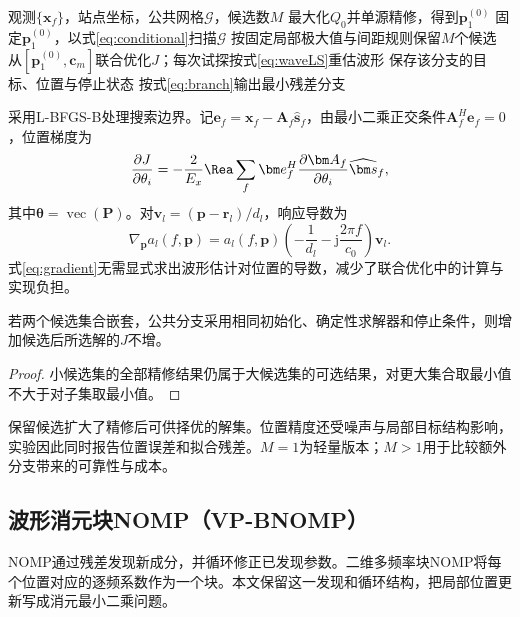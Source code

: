 \begin{algorithm}[H]
\caption{多候选联合精修AP}\label{alg:ap}
\begin{algorithmic}[1]
\Require 观测$\{\bm x_f\}$，站点坐标，公共网格$\mathcal G$，候选数$M$
\State 最大化$Q_0$并单源精修，得到$\bm p_1^{(0)}$
\State 固定$\bm p_1^{(0)}$，以式\eqref{eq:conditional}扫描$\mathcal G$
\State 按固定局部极大值与间距规则保留$M$个候选
  \State 从$[\bm p_1^{(0)},\bm c_m]$联合优化$J$；每次试探按式\eqref{eq:waveLS}重估波形
  \State 保存该分支的目标、位置与停止状态
\EndFor
\State 按式\eqref{eq:branch}输出最小残差分支
\end{algorithmic}
\end{algorithm}

采用L-BFGS-B处理搜索边界\cite{Byrd1995}。记$\bm e_f=\bm x_f-\bm A_f\widehat{\bm s}_f$，由最小二乘正交条件$\bm A_f^H\bm e_f=0$，位置梯度为
\begin{equation}
 \frac{\partial J}{\partial\theta_i}
 =-\frac{2}{E_x}\Rea\sum_f
 \bm e_f^H\frac{\partial\bm A_f}{\partial\theta_i}
 \widehat{\bm s}_f,\label{eq:gradient}
\end{equation}
其中$\bm\theta=\operatorname{vec}(\bm P)$。对$\bm v_l=(\bm p-\bm r_l)/d_l$，响应导数为
\begin{equation}
 \nabla_{\bm p}a_l(f,\bm p)
 =a_l(f,\bm p)\left(-\frac1{d_l}-\mathrm j\frac{2\pi f}{c_0}\right)\bm v_l.
 \label{eq:responseDerivative}
\end{equation}
式\eqref{eq:gradient}无需显式求出波形估计对位置的导数，减少了联合优化中的计算与实现负担。

\begin{proposition}[嵌套候选的目标关系]\label{prop:branches}
若两个候选集合嵌套，公共分支采用相同初始化、确定性求解器和停止条件，则增加候选后所选解的$J$不增。
\end{proposition}
\begin{proof}
小候选集的全部精修结果仍属于大候选集的可选结果，对更大集合取最小值不大于对子集取最小值。
\end{proof}
保留候选扩大了精修后可供择优的解集。位置精度还受噪声与局部目标结构影响，实验因此同时报告位置误差和拟合残差。$M=1$为轻量版本；$M>1$用于比较额外分支带来的可靠性与成本。

\subsection{波形消元块NOMP（VP-BNOMP）}\label{sec:vpnomp}
NOMP通过残差发现新成分，并循环修正已发现参数\cite{Mamandipoor2016}。二维多频率块NOMP将每个位置对应的逐频系数作为一个块\cite{Yang2022}。本文保留这一发现和循环结构，把局部位置更新写成消元最小二乘问题。

